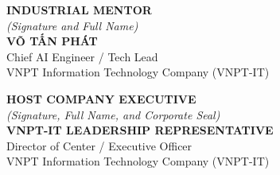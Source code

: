\vspace{1.0cm}

\noindent
\begin{minipage}[t]{0.48\textwidth}
\centering
\textbf{INDUSTRIAL MENTOR}\\[0.15cm]
\textit{(Signature and Full Name)}\\[2.8cm]
\textbf{VÕ TẤN PHÁT}\\[0.1cm]
Chief AI Engineer / Tech Lead\\
VNPT Information Technology Company (VNPT-IT)
\end{minipage}
\hfill
\begin{minipage}[t]{0.48\textwidth}
\centering
\textbf{HOST COMPANY EXECUTIVE}\\[0.15cm]
\textit{(Signature, Full Name, and Corporate Seal)}\\[2.8cm]
\textbf{VNPT-IT LEADERSHIP REPRESENTATIVE}\\[0.1cm]
Director of Center / Executive Officer\\
VNPT Information Technology Company (VNPT-IT)
\end{minipage}
